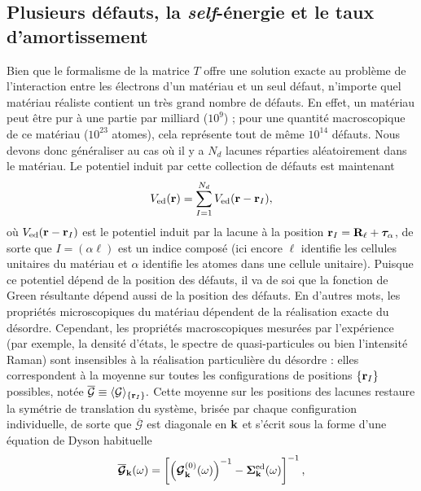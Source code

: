 \subsection{Plusieurs défauts, la \textit{self}-énergie et le taux d'amortissement}\label{sec:mbt_sigma}
Bien que le formalisme de la matrice $T$ offre une solution exacte au problème de l'interaction entre les électrons d'un matériau et un seul défaut, n'importe quel matériau réaliste contient un très grand nombre de défauts. En effet, un matériau peut être pur à une partie par milliard ($10^9$) ; pour une quantité macroscopique de ce matériau ($10^{23}$ atomes), cela représente tout de même $10^{14}$ défauts. Nous devons donc généraliser au cas où il y a $N_d$ lacunes réparties aléatoirement dans le matériau. Le potentiel induit par cette collection de défauts est maintenant
\begin{equation}
    V_\text{ed}(\mathbf{r}) = \sum_{I=1}^{N_d}V_\text{ed}(\mathbf{r}-\mathbf{r}_I),
\end{equation}
où $V_\text{ed}(\mathbf{r}-\mathbf{r}_I)$ est le potentiel induit par la lacune à la position $\mathbf{r}_I=\mathbf{R}_\ell+\bm\tau_\alpha$, de sorte que $I=(\alpha\ell)$ est un indice composé (ici encore $\ell$ identifie les cellules unitaires du matériau et $\alpha$ identifie les atomes dans une cellule unitaire). Puisque ce potentiel dépend de la position des défauts, il va de soi que la fonction de Green résultante dépend aussi de la position des défauts. En d'autres mots, les propriétés microscopiques du matériau dépendent de la réalisation exacte du désordre. Cependant, les propriétés macroscopiques mesurées par l'expérience (par exemple, la densité d'états, le spectre de quasi-particules ou bien l'intensité Raman) sont insensibles à la réalisation particulière du désordre : elles correspondent à la moyenne sur toutes les configurations de positions $\{\mathbf{r}_I\}$ possibles, notée $\overline{\mathcal{G}}\equiv\langle\mathcal{G}\rangle_{\{\mathbf{r}_I\}}.$ Cette moyenne sur les positions des lacunes restaure la symétrie de translation du système, brisée par chaque configuration individuelle, de sorte que $\overline{\mathcal{G}}$ est diagonale en $\mathbf{k}$ et s'écrit sous la forme d'une équation de Dyson habituelle~\cite{mahanManyParticlePhysics2000}
\begin{equation}
    \overline{\bm{\mathcal{G}}}_{\mathbf{k}}(\omega) = \left[\left(\bm{\mathcal{G}}^{(0)}_{\mathbf{k}}(\omega)\right)^{-1}-\bm{\Sigma}_{\mathbf{k}}^\text{ed}(\omega)\right]^{-1},\label{eqn:G_moyenne}
\end{equation}
